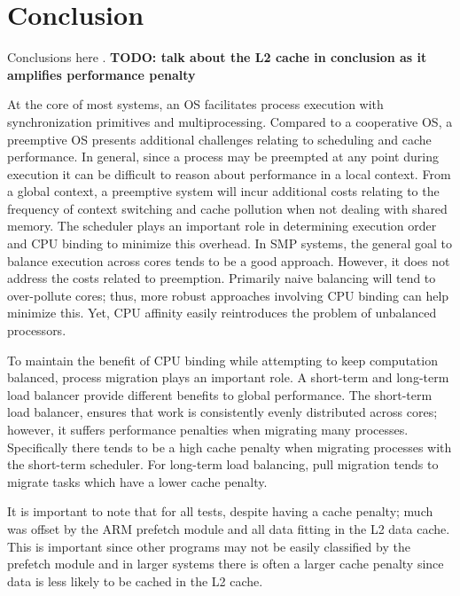 \documentclass[11pt]{article}
\begin{document}
\section{Conclusion}
\label{sec:conclusion}

Conclusions here \cite{freebsd} \cite{unix}.
\textbf{TODO: talk about the L2 cache in conclusion as it amplifies performance penalty}

At the core of most systems, an OS facilitates process execution with synchronization primitives and multiprocessing.  Compared to a cooperative OS, a preemptive OS presents additional challenges relating to scheduling and cache performance.  In general, since a process may be preempted at any point during execution it can be difficult to reason about performance in a local context.  From a global context, a preemptive system will incur additional costs relating to the frequency of context switching and cache pollution when not dealing with shared memory.  The scheduler plays an important role in determining execution order and CPU binding to minimize this overhead.  In SMP systems, the general goal to balance execution across cores tends to be a good approach.  However, it does not address the costs related to preemption.  Primarily naive balancing will tend to over-pollute cores; thus, more robust approaches involving CPU binding can help minimize this.  Yet, CPU affinity easily reintroduces the problem of unbalanced processors.

To maintain the benefit of CPU binding while attempting to keep computation balanced, process migration plays an important role.  A short-term and long-term load balancer provide different benefits to global performance.  The short-term load balancer, ensures that work is consistently evenly distributed across cores; however, it suffers performance penalties when migrating many processes.  Specifically there tends to be a high cache penalty when migrating processes with the short-term scheduler.  For long-term load balancing, pull migration tends to migrate tasks which have a lower cache penalty.


It is important to note that for all tests, despite having a cache penalty; much was offset by the ARM prefetch module and all data fitting in the L2 data cache.  This is important since other programs may not be easily classified by the prefetch module and in larger systems there is often a larger cache penalty since data is less likely to be cached in the L2 cache.
\end{document}
